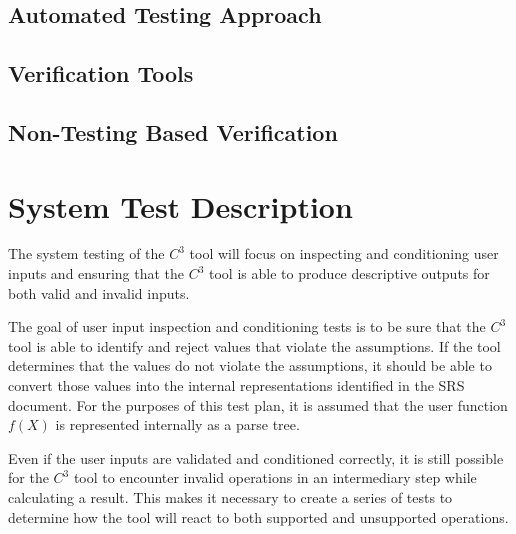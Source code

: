 \documentclass[12pt, titlepage]{article}
\newcommand{\prognameAbbrv}{$C^{3}$}
\begin{document}
\subsection{Automated Testing Approach}

\subsection{Verification Tools}


		

\subsection{Non-Testing Based Verification}


\section{System Test Description}
The system testing of the \prognameAbbrv{} tool will focus on inspecting and 
conditioning user inputs and ensuring that the \prognameAbbrv{} tool is able to 
produce descriptive outputs for both valid and invalid inputs. 

The goal of user input inspection and conditioning tests is to be sure that the 
\prognameAbbrv{} tool is able to identify and reject values that violate the 
assumptions. If the tool determines that the values do not violate the 
assumptions, it should be able to convert those values into the internal 
representations identified in the SRS document. For the purposes of this test 
plan, it is assumed that the user function $f(X)$ is represented internally as 
a parse tree.

Even if the user inputs are validated and conditioned correctly, it is still 
possible for the \prognameAbbrv{} tool to encounter invalid operations in an 
intermediary step while calculating a result. This makes it necessary to create 
a series of tests to determine how the tool will react to both supported and 
unsupported operations.
	
\end{document}
